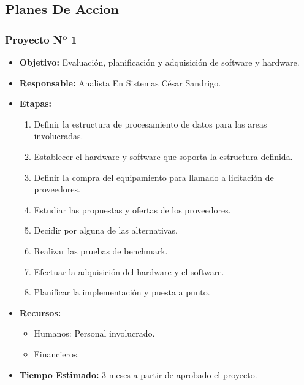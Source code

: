 \subsection{Planes De Accion}

\subsubsection{Proyecto Nº 1}

\begin{itemize}
\item \textbf{Objetivo:} Evaluación, planificación y adquisición de software y hardware.
\item \textbf{Responsable:} Analista En Sistemas César Sandrigo.
\item \textbf{Etapas:}
\begin{enumerate}
\item Definir la estructura de procesamiento de datos para las areas involucradas.
\item Establecer el hardware y software que soporta la estructura definida.
\item Definir la compra del equipamiento para llamado a licitación de proveedores.
\item Estudiar las propuestas y ofertas de los proveedores.
\item Decidir por alguna de las alternativas.
\item Realizar las pruebas de benchmark.
\item Efectuar la adquisición del hardware y el software.
\item Planificar la implementación y puesta a punto.
\end{enumerate}
\item \textbf{Recursos:}
\begin{itemize}
\item Humanos: Personal involucrado.
\item Financieros.
\end{itemize}
\item \textbf{Tiempo Estimado:} 3 meses a partir de aprobado el proyecto.
\end{itemize}